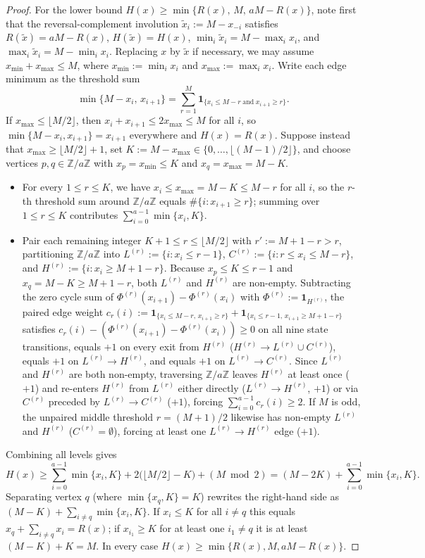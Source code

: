 \documentclass[preprint,12pt]{elsarticle}
\newcommand{\Z}{\mathbb Z}
\numberwithin{equation}{section}
\theoremstyle{plain}
\theoremstyle{definition}
\theoremstyle{remark}
\begin{document}
\begin{proof}
For the lower bound $H(x)\ge\min\{R(x),\,M,\,aM-R(x)\}$, note first that the
reversal-complement involution $\tilde{x}_i:=M-x_{-i}$ satisfies
$R(\tilde{x})=aM-R(x)$, $H(\tilde{x})=H(x)$, $\min_i\tilde{x}_i=M-\max_i x_i$,
and $\max_i\tilde{x}_i=M-\min_i x_i$. Replacing $x$ by $\tilde{x}$ if necessary,
we may assume $x_{\min}+x_{\max}\le M$, where $x_{\min}:=\min_i x_i$ and
$x_{\max}:=\max_i x_i$. Write each edge minimum as the threshold sum
\[
\min\{M-x_i,\,x_{i+1}\}
 =\sum_{r=1}^{M}\mathbf 1_{\{x_i\le M-r\;\text{and}\;x_{i+1}\ge r\}}.
\]
If $x_{\max}\le\lfloor M/2\rfloor$, then $x_i+x_{i+1}\le 2x_{\max}\le M$ for all
$i$, so $\min\{M-x_i,x_{i+1}\}=x_{i+1}$ everywhere and $H(x)=R(x)$. Suppose
instead that $x_{\max}\ge\lfloor M/2\rfloor+1$, set $K:=M-x_{\max}\in
\{0,\dots,\lfloor(M-1)/2\rfloor\}$, and choose vertices $p,q\in\Z/a\Z$ with
$x_p=x_{\min}\le K$ and $x_q=x_{\max}=M-K$.
\begin{itemize}
\item For every $1\le r\le K$, we have $x_i\le x_{\max}=M-K\le M-r$ for all $i$,
so the $r$-th threshold sum around $\Z/a\Z$ equals $\#\{i:x_{i+1}\ge r\}$; summing
over $1\le r\le K$ contributes $\sum_{i=0}^{a-1}\min\{x_i,K\}$.
\item Pair each remaining integer $K+1\le r\le\lfloor M/2\rfloor$ with
$r':=M+1-r>r$, partitioning $\Z/a\Z$ into $L^{(r)}:=\{i:x_i\le r-1\}$,
$C^{(r)}:=\{i:r\le x_i\le M-r\}$, and $H^{(r)}:=\{i:x_i\ge M+1-r\}$. Because
$x_p\le K\le r-1$ and $x_q=M-K\ge M+1-r$, both $L^{(r)}$ and $H^{(r)}$ are
non-empty. Subtracting the zero cycle sum of $\Phi^{(r)}(x_{i+1})-\Phi^{(r)}(x_i)$
with $\Phi^{(r)}:=\mathbf 1_{H^{(r)}}$, the paired edge weight
$c_r(i):=\mathbf 1_{\{x_i\le M-r,\,x_{i+1}\ge r\}}+\mathbf 1_{\{x_i\le r-1,\,x_{i+1}\ge M+1-r\}}$
satisfies $c_r(i)-(\Phi^{(r)}(x_{i+1})-\Phi^{(r)}(x_i))\ge 0$ on all nine state
transitions, equals $+1$ on every exit from $H^{(r)}$ ($H^{(r)}\to L^{(r)}\cup C^{(r)}$),
equals $+1$ on $L^{(r)}\to H^{(r)}$, and equals $+1$ on $L^{(r)}\to C^{(r)}$.
Since $L^{(r)}$ and $H^{(r)}$ are both non-empty, traversing $\Z/a\Z$ leaves
$H^{(r)}$ at least once ($+1$) and re-enters $H^{(r)}$ from $L^{(r)}$ either
directly ($L^{(r)}\to H^{(r)}$, $+1$) or via $C^{(r)}$ preceded by
$L^{(r)}\to C^{(r)}$ ($+1$), forcing $\sum_{i=0}^{a-1}c_r(i)\ge 2$. If $M$ is odd,
the unpaired middle threshold $r=(M+1)/2$ likewise has non-empty $L^{(r)}$ and
$H^{(r)}$ ($C^{(r)}=\emptyset$), forcing at least one $L^{(r)}\to H^{(r)}$ edge
($+1$).
\end{itemize}
Combining all levels gives
\[
H(x)\ge\sum_{i=0}^{a-1}\min\{x_i,K\}+2\bigl(\lfloor M/2\rfloor-K\bigr)+(M\bmod 2)
    =(M-2K)+\sum_{i=0}^{a-1}\min\{x_i,K\}.
\]
Separating vertex $q$ (where $\min\{x_q,K\}=K$) rewrites the right-hand side as
$(M-K)+\sum_{i\neq q}\min\{x_i,K\}$. If $x_i\le K$ for all $i\neq q$ this equals
$x_q+\sum_{i\neq q}x_i=R(x)$; if $x_{i_1}\ge K$ for at least one $i_1\neq q$ it
is at least $(M-K)+K=M$. In every case $H(x)\ge\min\{R(x),M,aM-R(x)\}$.


\end{proof}
\end{document}
